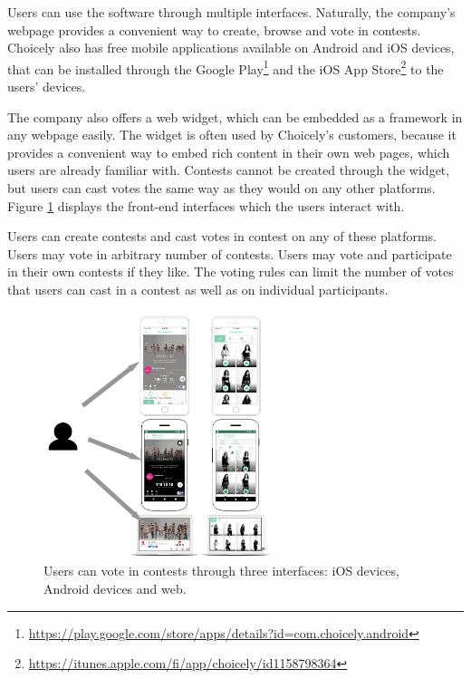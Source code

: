     Users can use the software through multiple interfaces. Naturally, the company's webpage provides a convenient way to create, browse and vote in contests. Choicely also has free mobile applications available on Android and iOS devices, that can be installed through the Google Play\footnote{\url{https://play.google.com/store/apps/details?id=com.choicely.android}} and the iOS App Store\footnote{\url{https://itunes.apple.com/fi/app/choicely/id1158798364}} to the users' devices. 

    The company also offers a web widget, which can be embedded as a framework in any webpage easily. The widget is often used by Choicely's customers, because it provides a convenient way to embed rich content in their own web pages, which users are already familiar with. Contests cannot be created through the widget, but users can cast votes the same way as they would on any other platforms. Figure \ref{choicely_platforms} displays the front-end interfaces which the users interact with.
    
    Users can create contests and cast votes in contest on any of these platforms. Users may vote in arbitrary number of contests. Users may vote and participate in their own contests if they like. The voting rules can limit the number of votes that users can cast in a contest as well as on individual participants. 

    \begin{figure}[h]
        \begin{center}
            \includegraphics[width=0.6\textwidth]{images/choicely_platforms.png}
            \caption{Users can vote in contests through three interfaces: iOS devices, Android devices and web.}
            \label{choicely_platforms}
        \end{center}
    \end{figure} 

